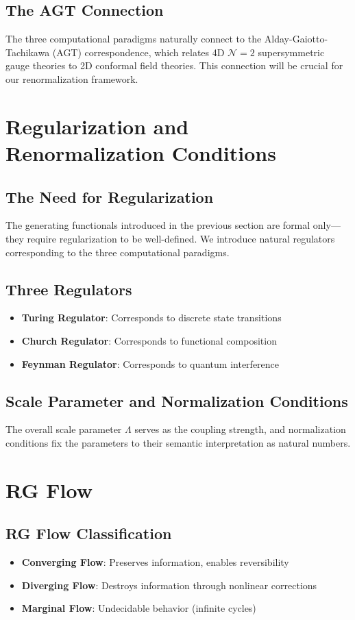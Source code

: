 \documentclass[11pt,a4paper]{article}
\theoremstyle{definition}
\begin{document}
\subsection{The AGT Connection}
The three computational paradigms naturally connect to the Alday-Gaiotto-Tachikawa (AGT) correspondence, which relates 4D $\mathcal{N}=2$ supersymmetric gauge theories to 2D conformal field theories. This connection will be crucial for our renormalization framework.

\section{Regularization and Renormalization Conditions}
\label{sec:regularization}

\subsection{The Need for Regularization}
The generating functionals introduced in the previous section are formal only—they require regularization to be well-defined. We introduce natural regulators corresponding to the three computational paradigms.

\subsection{Three Regulators}
\begin{itemize}
\item \textbf{Turing Regulator}: Corresponds to discrete state transitions
\item \textbf{Church Regulator}: Corresponds to functional composition
\item \textbf{Feynman Regulator}: Corresponds to quantum interference
\end{itemize}

\subsection{Scale Parameter and Normalization Conditions}
The overall scale parameter $\Lambda$ serves as the coupling strength, and normalization conditions fix the parameters to their semantic interpretation as natural numbers.

\section{RG Flow}
\label{sec:rg-flow}

\subsection{RG Flow Classification}
\begin{itemize}
\item \textbf{Converging Flow}: Preserves information, enables reversibility
\item \textbf{Diverging Flow}: Destroys information through nonlinear corrections
\item \textbf{Marginal Flow}: Undecidable behavior (infinite cycles)
\end{itemize}
\end{document}
